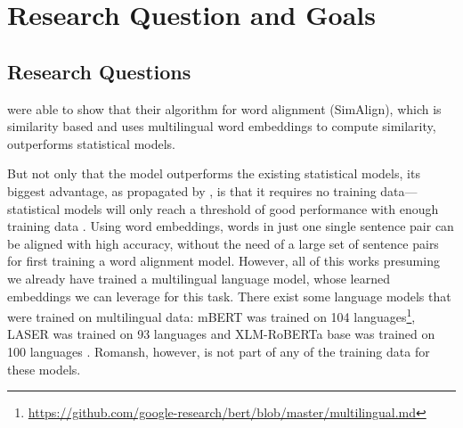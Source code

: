 


\section{Research Question and Goals}
\subsection{Research Questions}
\cite{jalili-sabet-etal-2020-simalign} were able to show that their algorithm for word alignment (SimAlign), which is similarity based and uses multilingual word embeddings to compute similarity, outperforms statistical models. 

But not only that the model outperforms the existing statistical models, its biggest advantage, as propagated by \cite{jalili-sabet-etal-2020-simalign}, is that it requires no training data--- 
statistical models will only reach a threshold of good performance with enough training data \autocites{jalili-sabet-etal-2020-simalign,och-ney-2000-improved}. 
Using word embeddings, words in just one single sentence pair can be aligned with high accuracy, without the need of a large set of sentence pairs for first training a word alignment model.
However, all of this works presuming we already have trained a multilingual language model, whose learned embeddings we can leverage for this task. 
There exist some language models that were trained on multilingual data: 
mBERT was trained on 104 languages\footnote{\url{https://github.com/google-research/bert/blob/master/multilingual.md}}, LASER was trained on 93 languages \autocite{artexte-schwenk-2019-laser} and XLM-RoBERTa base was trained on 100 languages \autocite{conneau-etal-2020-xlm}. Romansh, however, is not part of any of the training data for these models.

